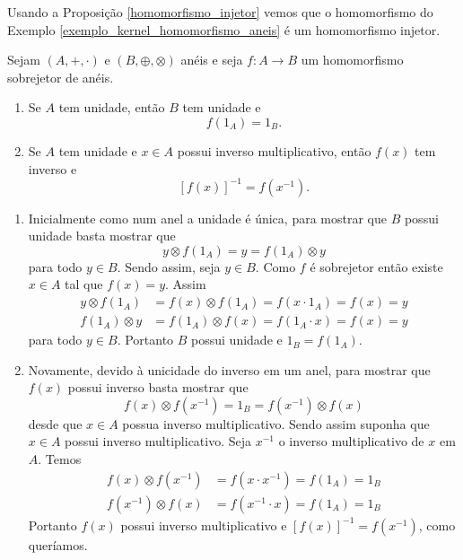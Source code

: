 Usando a Proposição \ref{homomorfismo_injetor} vemos que o homomorfismo do Exemplo \ref{exemplo_kernel_homomorfismo_aneis} é um homomorfismo injetor.
\begin{proposicao}
    Sejam $(A, +, \cdot)$ e $(B, \oplus, \otimes)$ anéis e seja $f : A \to B$ um homomorfismo sobrejetor de anéis.
    \begin{enumerate}[label={\roman*})]
        \item Se $A$ tem unidade, então $B$ tem unidade e
        \[
            f(1_A) = 1_B.
        \]
        \item Se $A$ tem unidade e $x \in A$ possui inverso multiplicativo, então $f(x)$ tem inverso e
        \[
            [f(x)]^{-1} = f(x^{-1}).
        \]
    \end{enumerate}
\end{proposicao}
\begin{prova}
    \begin{enumerate}[label={\roman*})]
        \item Inicialmente como num anel a unidade é única, para mostrar que $B$ possui unidade basta mostrar que
        \[
            y\otimes f(1_A) = y = f(1_A)\otimes y
        \]
        para todo $y \in B$. Sendo assim, seja $y \in B$. Como $f$ é sobrejetor então existe $x \in A$ tal que $f(x) = y$. Assim
        \begin{align*}
            y\otimes f(1_A) &= f(x) \otimes f(1_A) = f(x\cdot 1_A) = f(x) = y\\
            f(1_A)\otimes y &= f(1_A) \otimes f(x) = f(1_A\cdot x) = f(x) = y
        \end{align*}
        para todo $y \in B$. Portanto $B$ possui unidade e $1_B = f(1_A)$.

        \item Novamente, devido à unicidade do inverso em um anel, para mostrar que $f(x)$ possui inverso basta mostrar que
        \[
            f(x)\otimes f(x^{-1}) = 1_B = f(x^{-1})\otimes f(x)
        \]
        desde que $x \in A$ possua inverso multiplicativo. Sendo assim suponha que $x \in A$ possui inverso multiplicativo. Seja $x^{-1}$ o inverso multiplicativo de $x$ em $A$.
        Temos
        \begin{align*}
            f(x)\otimes f(x^{-1}) &= f(x\cdot x^{-1}) = f(1_A) = 1_B\\
            f(x^{-1})\otimes f(x) &= f(x^{-1}\cdot x) = f(1_A) = 1_B
        \end{align*}
        Portanto $f(x)$ possui inverso multiplicativo e $[f(x)]^{-1} = f(x^{-1})$, como queríamos.
    \end{enumerate}
\end{prova}


